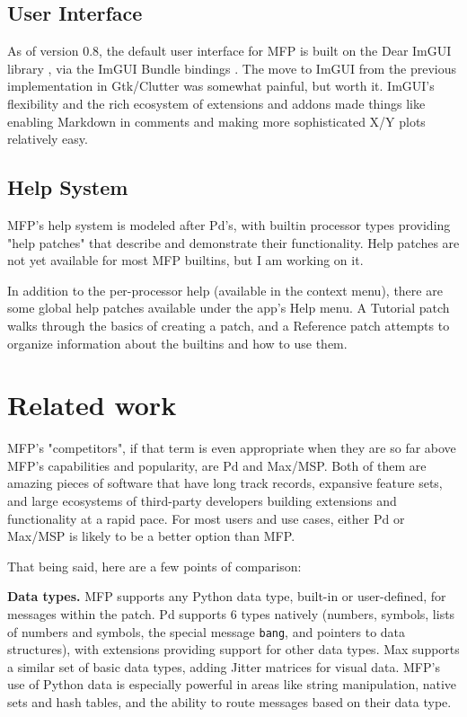 \documentclass[a4paper]{article}
\begin{document}
\subsection{User Interface}

As of version 0.8, the default user interface for MFP is built on
the Dear ImGUI library \cite{DearImGUI}, via the ImGUI Bundle
bindings \cite{ImguiBundle}. The move to ImGUI from the previous
implementation in Gtk/Clutter was somewhat painful, but worth it.
ImGUI's flexibility and the rich ecosystem of extensions and
addons made things like enabling Markdown in comments and making
more sophisticated X/Y plots relatively easy.

\subsection{Help System}

MFP's help system is modeled after Pd's, with builtin processor
types providing "help patches" that describe and demonstrate
their functionality. Help patches are not yet available for most
MFP builtins, but I am working on it.

In addition to the per-processor help (available in the context menu),
there are some global help patches available under the app's Help menu.
A Tutorial patch walks through the basics of creating a patch, and
a Reference patch attempts to organize information about the
builtins and how to use them.


\section{Related work}

MFP's "competitors", if that term is even appropriate when they
are so far above MFP's capabilities and popularity, are Pd and
Max/MSP. Both of them are amazing pieces of software that have
long track records, expansive feature sets, and large ecosystems
of third-party developers building extensions and functionality
at a rapid pace. For most users and use cases, either Pd or
Max/MSP is likely to be a better option than MFP.

That being said, here are a few points of comparison:

{\bf Data types.} MFP supports any Python data type, built-in or
user-defined, for messages within the patch. Pd supports 6 types
natively (numbers, symbols, lists of numbers and symbols, the
special message {\tt bang}, and pointers to data structures),
with extensions providing support for other data types. Max
supports a similar set of basic data types, adding Jitter
matrices for visual data. MFP's use of Python data is especially
powerful in areas like string manipulation, native sets and hash
tables, and the ability to route messages based on their data
type.
\end{document}
